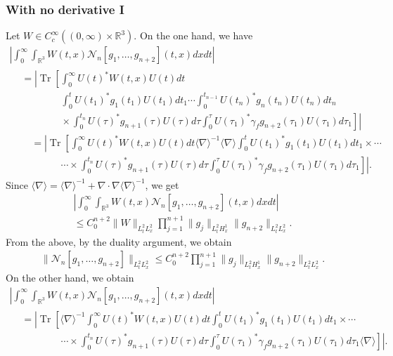 \documentclass[10pt,a4paper]{amsart}
\newcommand{\BR}{\mathbb{R}}
\newcommand{\CN}{\mathcal{N}}
\newcommand{\ga}{\gamma}
\newcommand{\ta}{\tau}
\newcommand{\abs}[1]{\left|#1\right|}
\newcommand{\I}{\infty}
\DeclareMathOperator{\Tr}{Tr}
\newcommand{\sd}{\langle \nabla \rangle}
\newcommand{\sdi}{\sd^{-1}}
\newcommand{\R}{\mathbb{R}}
\newcommand{\na}{\nabla}
\begin{document}
\subsubsection{With no derivative I}

Let $W \in C_c^\I((0,\I) \times \BR^3)$. On the one hand, we have
\begin{multline}
\abs{\int_0^\I \int_{\R^3} W(t,x) \CN_n[g_1,\dots,g_{n+2}](t,x) dx dt } \\
\begin{aligned}
& = \left| \Tr \left[\int_0^\I U(t)^* W(t,x) U(t) dt
\right. \right.\\
&\qquad \qquad\int_0^t U(t_1)^* g_1(t_1) U(t_1)dt_1
\cdots
\int_0^{t_{n-1}} U(t_n)^* g_n(t_n) U(t_n)dt_n
\\
&\left. \left. \qquad \qquad \times
\int_0^{t_n} U(\ta)^* g_{n+1}(\ta) U(\ta)d\ta
\int_0^\ta U(\ta_1)^* \ga_f g_{n+2}(\ta_1) U(\ta_1)d\ta_1 \right] \right| \\
&\quad = \left| \Tr \left[\int_0^\I U(t)^* W(t,x) U(t) dt \sdi
\sd \int_0^t U(t_1)^* g_1(t_1) U(t_1)dt_1
\times
\cdots
\right. \right. \\
&\left. \left. \qquad \qquad \cdots \times
\int_0^{t_n} U(\ta)^* g_{n+1}(\ta) U(\ta)d\ta
\int_0^\ta U(\ta_1)^* \ga_f g_{n+2}(\ta_1) U(\ta_1)d\ta_1 \right] \right|.
\end{aligned}
\end{multline}
Since $\sd = \sdi + \na \cdot \na \sdi$, we get
\begin{multline}
\abs{\int_0^\I \int_{\R^3} W(t,x) \CN_n[g_1,\dots,g_{n+2}](t,x) dx dt }\\
\le C_0^{n+2} \|W\|_{L^2_t L^2_x} \prod_{j=1}^{n+1}\|g_j\|_{L^2_t H^1_x} \|g_{n+2}\|_{L^2_t L^2_x}.
\end{multline}
From the above, by the duality argument, we obtain
\begin{align}\label{eq:inter. g}
\|\CN_n[g_1,\dots,g_{n+2}]\|_{L^2_t L^2_x} \le C_0^{n+2} \prod_{j=1}^{n+1}\|g_j\|_{L^2_t H^1_x} \|g_{n+2}\|_{L^2_t L^2_x}.
\end{align}
On the other hand, we obtain
\begin{multline}
\abs{\int_0^\I \int_{\R^3} W(t,x) \CN_n[g_1,\dots,g_{n+2}](t,x) dx dt } \\
\begin{aligned}
&= \left| \Tr \left[\sdi \int_0^\I U(t)^* W(t,x) U(t) dt \int_0^t U(t_1)^* g_1(t_1) U(t_1)dt_1
\times
\cdots
\right. \right. \\
&\left. \left. \qquad \qquad \cdots \times
\int_0^{t_n} U(\ta)^* g_{n+1}(\ta) U(\ta)d\ta
\int_0^\ta U(\ta_1)^* \ga_f g_{n+2}(\ta_1) U(\ta_1)d\ta_1 \sd \right] \right|.
\end{aligned}
\end{multline}
\end{document}
